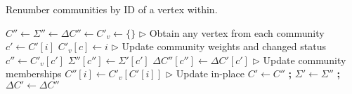 \begin{algorithm}[hbtp]
\caption{Renumber communities by ID of a vertex within.}
\label{alg:leidensr}
\begin{algorithmic}[1]

\Statex

  \State $C'' \gets \Sigma'' \gets \Delta C'' \gets C'_v \gets \{\}$ \label{alg:leidensr--init}
  \State $\rhd$ Obtain any vertex from each community
    \State $c' \gets C'[i]$
     $C'_v[c] \gets i$
    \EndIf
  \EndFor
  \State $\rhd$ Update community weights and changed status
    \State $c'' \gets C'_v[c']$
      \State $\Sigma''[c''] \gets \Sigma'[c']$
      \State $\Delta C''[c''] \gets \Delta C'[c']$
    \EndIf
  \EndFor
  \State $\rhd$ Update community memberships
    \State $C''[i] \gets C'_v[C'[i]]$
  \EndFor
  \State $\rhd$ Update in-place
  \State $C' \gets C''$ \textbf{;} $\Sigma' \gets \Sigma''$ \textbf{;} $\Delta C' \gets \Delta C''$
\EndFunction
\end{algorithmic}
\end{algorithm}
